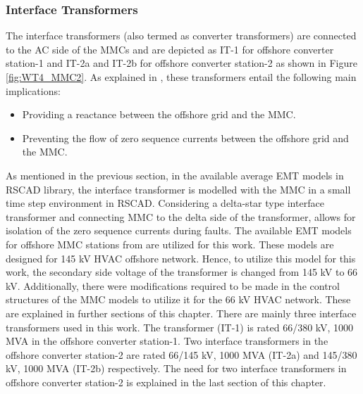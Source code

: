 \subsubsection{Interface Transformers}
The interface transformers (also termed as converter transformers) are connected to the \gls{AC} side of the \gls{MMC}s and are depicted as IT-1 for offshore converter station-1 and IT-2a and IT-2b for offshore converter station-2 as shown in Figure \ref{fig:WT4_MMC2}. As explained in \cite{cigre2005b4}, these transformers entail the following main implications:
\begin{itemize}
    \item Providing a reactance between the offshore grid and the \gls{MMC}.
    \item Preventing the flow of zero sequence currents between the offshore grid and the \gls{MMC}.
\end{itemize} 

As mentioned in the previous section, in the available average \gls{EMT} models in RSCAD library, the interface transformer is modelled with the \gls{MMC} in a small time step environment in RSCAD. Considering a delta-star type interface transformer and connecting \gls{MMC} to the delta side of the transformer, allows for isolation of the zero sequence currents during faults. The available \gls{EMT} models for offshore \gls{MMC} stations from \cite{vrana2013cigre} are utilized for this work. These models are designed for 145 kV \gls{HVAC} offshore network. Hence, to utilize this model for this work, the secondary side voltage of the transformer is changed from 145 kV to 66 kV. Additionally, there were modifications required to be made in the control structures of the \gls{MMC} models to utilize it for the 66 kV \gls{HVAC} network. These are explained in further sections of this chapter. There are mainly three interface transformers used in this work. The transformer (IT-1) is rated 66/380 kV, 1000 MVA in the offshore converter station-1. Two interface transformers in the offshore converter station-2 are rated 66/145 kV, 1000 MVA (IT-2a) and 145/380 kV, 1000 MVA (IT-2b) respectively. The need for two interface transformers in offshore converter station-2 is explained in the last section of this chapter.


